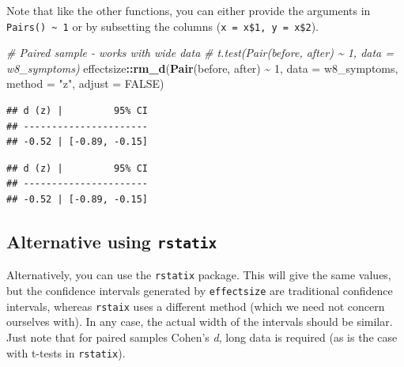 \documentclass[
]{book}
\newenvironment{Shaded}{\begin{snugshade}}{\end{snugshade}}
\newcommand{\AttributeTok}[1]{\textcolor[rgb]{0.13,0.29,0.53}{#1}}
\newcommand{\CommentTok}[1]{\textcolor[rgb]{0.56,0.35,0.01}{\textit{#1}}}
\newcommand{\ConstantTok}[1]{\textcolor[rgb]{0.56,0.35,0.01}{#1}}
\newcommand{\DecValTok}[1]{\textcolor[rgb]{0.00,0.00,0.81}{#1}}
\newcommand{\FunctionTok}[1]{\textcolor[rgb]{0.13,0.29,0.53}{\textbf{#1}}}
\newcommand{\NormalTok}[1]{#1}
\newcommand{\SpecialCharTok}[1]{\textcolor[rgb]{0.81,0.36,0.00}{\textbf{#1}}}
\newcommand{\StringTok}[1]{\textcolor[rgb]{0.31,0.60,0.02}{#1}}
\begin{document}
Note that like the other functions, you can either provide the arguments in \texttt{Pairs()\ \textasciitilde{}\ 1} or by subsetting the columns (\texttt{x\ =\ x\$1,\ y\ =\ x\$2}).

\begin{Shaded}
\begin{Highlighting}[]
\CommentTok{\# Paired sample {-} works with wide data}
\CommentTok{\# t.test(Pair(before, after) \textasciitilde{} 1, data = w8\_symptoms)}
\NormalTok{effectsize}\SpecialCharTok{::}\FunctionTok{rm\_d}\NormalTok{(}\FunctionTok{Pair}\NormalTok{(before, after) }\SpecialCharTok{\textasciitilde{}} \DecValTok{1}\NormalTok{, }\AttributeTok{data =}\NormalTok{ w8\_symptoms, }\AttributeTok{method =} \StringTok{"z"}\NormalTok{, }\AttributeTok{adjust =} \ConstantTok{FALSE}\NormalTok{)}
\end{Highlighting}
\end{Shaded}

\begin{verbatim}
## d (z) |         95% CI
## ----------------------
## -0.52 | [-0.89, -0.15]
\end{verbatim}

\begin{Shaded}
\end{Shaded}

\begin{verbatim}
## d (z) |         95% CI
## ----------------------
## -0.52 | [-0.89, -0.15]
\end{verbatim}

\hypertarget{alternative-using-rstatix}{%
\subsection{\texorpdfstring{Alternative using \texttt{rstatix}}{Alternative using rstatix}}\label{alternative-using-rstatix}}

Alternatively, you can use the \texttt{rstatix} package. This will give the same values, but the confidence intervals generated by \texttt{effectsize} are traditional confidence intervals, whereas \texttt{rstaix} uses a different method (which we need not concern ourselves with). In any case, the actual width of the intervals should be similar. Just note that for paired samples Cohen's \emph{d}, long data is required (as is the case with t-tests in \texttt{rstatix}).
\end{document}
